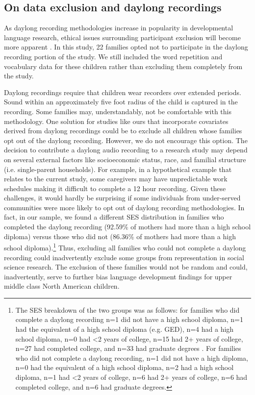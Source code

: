 \documentclass[a4paper,man,natbib,donotrepeattitle, apacite]{apa6}
\begin{document}
\subsection{On data exclusion and daylong recordings}

As daylong recording methodologies increase in popularity in developmental language research, ethical issues surrounding participant exclusion will become more apparent \cite{casillasStepbystepGuideCollecting2019}. In this study, 22 families opted not to participate in the daylong recording portion of the study. We still included the word repetition and vocabulary data for these children rather than excluding them completely from the study. 

Daylong recordings require that children wear recorders over extended periods. Sound within an approximately five foot radius of the child is captured in the recording. Some families may, understandably, not be comfortable with this methodology. One solution for studies like ours that incorporate covariates derived from daylong recordings could be to exclude all children whose families opt out of the daylong recording. However, we do not encourage this option. The decision to contribute a daylong audio recording to a research study may depend on several external factors like socioeconomic status, race, and familial structure (i.e. single-parent households). For example, in a hypothetical example that relates to the current study, some caregivers may have unpredictable work schedules making it difficult to complete a 12 hour recording. Given these challenges, it would hardly be surprising if some individuals from under-served communities were more likely to opt out of daylong recording methodologies. In fact, in our sample, we found a different SES distribution in families who completed the daylong recording (92.59\% of mothers had more than a high school diploma) versus those who did not (86.36\% of mothers had more than a high school diploma).\footnote{ The SES breakdown of the two groups was as follows: for families who did complete a daylong recording n=1 did not have a high school diploma, n=1 had the equivalent of a high school diploma (e.g. GED), n=4 had a high school diploma, n=0 had <2 years of college, n=15 had 2+ years of college, n=27 had completed college, and n=33 had graduate degrees . For families who did not complete a daylong recording, n=1 did not have a high diploma, n=0 had the equivalent of a high school diploma, n=2 had a high school diploma, n=1 had <2 years of college, n=6 had 2+ years of college, n=6 had completed college, and n=6 had graduate degrees.} Thus, excluding all families who could not complete a daylong recording could inadvertently exclude some groups from representation in social science research. The exclusion of these families would not be random and could, inadvertently, serve to further bias language development findings for upper middle class North American children. 
\end{document}
